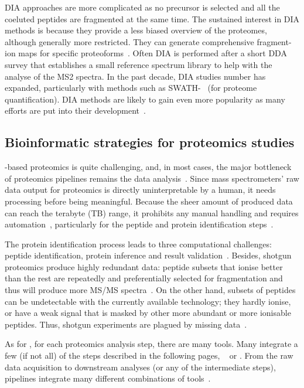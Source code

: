 \gls{DIA} approaches are more complicated
as no precursor is selected and
all the coeluted peptides are fragmented at the same time.
The sustained interest in \gls{DIA} methods is because
they provide a less biased overview of the proteomes,
although generally more restricted.
They can generate comprehensive fragment-ion maps for
specific proteoforms~.
Often \gls{DIA} is performed after a short \gls{DDA} survey
that establishes a small reference spectrum library
to help with the analyse of the MS2 spectra.
In the past decade, \gls{DIA} studies number has expanded,
particularly with methods such as SWATH-\ms~
(for proteome quantification).
\gls{DIA} methods are likely to gain even more popularity
as many efforts are put into their development~.\mybr\

\subsection{Bioinformatic strategies for proteomics studies}\label{sec:bioinfProt}

\ms-based proteomics is quite challenging,
and, in most cases,
the major bottleneck of proteomics pipelines remains
the data analysis~.
Since mass spectrometers' raw data output
for proteomics is directly uninterpretable by a human,
it needs processing before being meaningful.
Because the sheer amount of produced data can reach the terabyte (\gls{TB}) range,
it prohibits any manual handling and requires automation~,
particularly for the peptide and protein identification steps~.\mybr\

The protein identification process leads to three computational challenges:
peptide identification, protein inference and result validation~.
Besides, shotgun proteomics produce highly redundant data:
peptide subsets that ionise better than the rest
are repeatedly and preferentially selected for fragmentation
and thus will produce more \gls{MS/MS} spectra~.
On the other hand,
subsets of peptides can be undetectable with the currently available technology;
they hardly ionise, or have a weak signal that is masked
by other more abundant or more ionisable peptides.
Thus, shotgun experiments are plagued by missing data~.\mybr\

As for \Rnaseq, for each proteomics analysis step,
there are many tools.
Many integrate a few (if not all) of the steps described in the following pages,
\eg\ 
or .
From the raw data acquisition to downstream analyses
(or any of the intermediate steps),
pipelines integrate many different combinations of tools~.\mybr\

